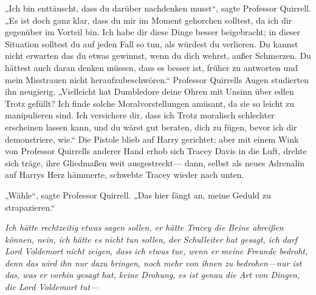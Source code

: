 „Ich bin enttäuscht, dass du darüber nachdenken musst“, sagte Professor Quirrell.
„Es ist doch ganz klar, dass du mir im Moment gehorchen solltest, da ich dir gegenüber im Vorteil bin. Ich habe dir diese Dinge besser beigebracht; in dieser Situation solltest du auf jeden Fall so tun, als würdest du verlieren. Du kannst nicht erwarten das du etwas gewinnst, wenn du dich wehrst, außer Schmerzen. Du hättest auch daran denken müssen, dass es besser ist, früher zu antworten und mein Misstrauen nicht heraufzubeschwören.“
Professor Quirrells Augen studierten ihn neugierig.
„Vielleicht hat Dumbledore deine Ohren mit Unsinn über edlen Trotz gefüllt? Ich finde solche Moralvorstellungen amüsant, da sie so leicht zu manipulieren sind. Ich versichere dir, dass ich Trotz moralisch schlechter erscheinen lassen kann, und du wärst gut beraten, dich zu fügen, bevor ich dir demonstriere, wie.“
Die Pistole blieb auf Harry gerichtet; aber mit einem Wink von Professor Quirrells anderer Hand erhob sich Tracey Davis in die Luft, drehte sich träge, ihre Gliedmaßen weit ausgestreckt—
dann, selbst als neues Adrenalin auf Harrys Herz hämmerte, schwebte Tracey wieder nach unten.

„Wähle“, sagte Professor Quirrell. „Das hier fängt an, meine Geduld zu strapazieren.“

\emph{Ich hätte rechtzeitig etwas sagen sollen, er hätte Tracey die Beine abreißen können, nein, ich hätte es nicht tun sollen, der Schulleiter hat gesagt, ich darf Lord Voldemort nicht zeigen, dass ich etwas tue, wenn er meine Freunde bedroht, denn das wird ihn nur dazu bringen, noch mehr von ihnen zu bedrohen—nur ist das, was er vorhin gesagt hat, keine \emph{Drohung}, es ist genau die Art von Dingen, die Lord Voldemort \emph{tut}—}

